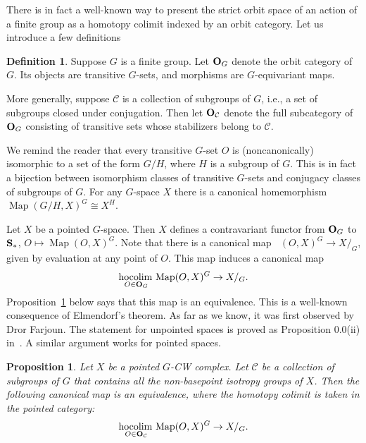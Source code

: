\documentclass[psamsfonts]{amsart}
\theoremstyle{plain}
\newtheorem{prop}[thm]{Proposition}
\theoremstyle{definition}
\newtheorem{defn}[thm]{Definition}
\theoremstyle{remark}
\newcommand{\catname}[1]{{\normalfont\textbf{#1}}}
\newcommand{\spaces}{\catname{S}_*}
\newcommand{\orbit}{\catname{O}}
\newcommand{\Normal}{\operatorname{N}}
\DeclareMathOperator{\map}{Map}
\DeclareMathOperator{\pointedmaps}{\map_*}
\DeclareMathOperator{\hocolim}{hocolim \,}
\begin{document}
There is in fact a well-known way to present the strict orbit space of an action of a finite group as a homotopy colimit indexed by an orbit category. Let us introduce a few definitions
\begin{defn}
Suppose $G$ is a finite group. Let $\orbit_G$ denote the orbit category of $G$. Its objects are transitive $G$-sets, and morphisms are $G$-equivariant maps.

More generally, suppose $\mathcal C$ is a collection of subgroups of $G$, i.e., a set of subgroups closed under conjugation. Then let $\orbit_{\mathcal C}$ denote the full subcategory of $\orbit_G$ consisting of transitive sets whose stabilizers belong to $\mathcal C$.
\end{defn}
We remind the reader that every transitive $G$-set $O$ is (noncanonically) isomorphic to a set of the form $G/H$, where $H$ is a subgroup of $G$. This is in fact a bijection between isomorphism classes of transitive $G$-sets and conjugacy classes of subgroups of $G$. For any $G$-space $X$ there is a canonical homemorphism $\map(G/H, X)^G\cong X^H$. %

Let $X$ be a pointed $G$-space. Then $X$ defines a contravariant functor from $\orbit_G$ to $\spaces$, $O\mapsto \map(O, X)^G$. Note that there is a canonical map $\pointedmaps(O, X)^G\to X/_G$, given by evaluation at any point of $O$. This map induces a canonical map
\[
\underset{O\in \orbit_G}{\hocolim} \map(O, X)^G \to X/_G.
\]
Proposition~\ref{prop:orbits homotopy colimit} below says that this map is an equivalence. This is a well-known consequence of Elmendorf's theorem. As far as we know, it was first observed by Dror Farjoun. The statement for unpointed spaces is proved as Proposition 0.0(ii) in~\cite{Slominska}. A similar argument works for pointed spaces.
\begin{prop}\label{prop:orbits homotopy colimit}
Let $X$ be a pointed $G$-CW complex. Let $\mathcal C$ be a collection of subgroups of $G$ that contains all the non-basepoint isotropy groups of $X$. Then the following canonical map is an equivalence, where the homotopy colimit is taken in the pointed category:
\begin{equation}\label{eq:orbits hocolim}
\underset{O\in \orbit_{\mathcal C}}{\hocolim} \map(O, X)^G \to X/_G.
\end{equation}
\end{prop}
\end{document}
